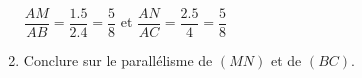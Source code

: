 \begin{corrige}
\begin{multicols}{2}
\begin{spacing}{1.5}
\begin{enumerate}
                {\color{red}
                $\dfrac{AM}{AB}=\dfrac{\num{1.5}}{\num{2.4}}=\dfrac{5}{8}$ et $\dfrac{AN}{AC}=\dfrac{\num{2.5}}{\num{4}}=\dfrac{5}{8}$
                }
                \item Conclure sur le parallélisme de $(MN)$ et de $(BC)$.
                
                {\color{red}
                }            
            \end{enumerate}
        \end{spacing}
    \end{multicols}
\end{corrige}

